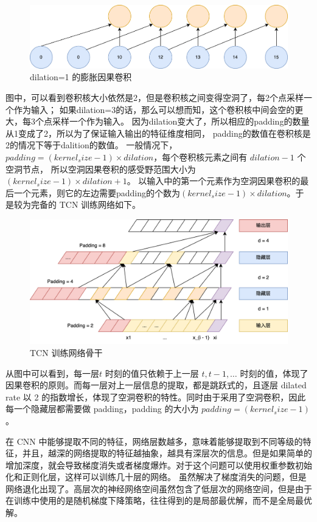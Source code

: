 \begin{figure}[htbp]
  \centering
  \includegraphics[width=\textwidth]{figures/dilation_convolution.png}
  \caption{dilation=1 的膨胀因果卷积}
\end{figure}

图中，可以看到卷积核大小依然是2，但是卷积核之间变得空洞了，每2个点采样一个作为输入；
如果dilation=3的话，那么可以想而知，这个卷积核中间会空的更大，每3个点采样一个作为输入。
因为dilation变大了，所以相应的padding的数量从1变成了2，所以为了保证输入输出的特征维度相同，
padding的数值在卷积核是2的情况下等于dalition的数值。
一般情况下，$padding=(kernel_size-1)\times dilation$，每个卷积核元素之间有 $dilation - 1$ 个空洞节点，
所以空洞因果卷积的感受野范围大小为 $(kernel_size-1) \times dilation + 1$。
以输入中的第一个元素作为空洞因果卷积的最后一个元素，则它的左边需要padding的个数为$(kernel_size-1) \times dilation$。于是较为完备的 TCN 训练网络如下。

\begin{figure}[htbp]
  \centering
  \includegraphics[width=\textwidth]{figures/tcn_1.png}
  \caption{TCN 训练网络骨干}
\end{figure}

从图中可以看到，每一层$t$ 时刻的值只依赖于上一层 $t, t - 1, \dots$ 时刻的值，体现了因果卷积的原则。而每一层对上一层信息的提取，都是跳跃式的，且逐层 dilated rate 以 2 的指数增长，体现了空洞卷积的特性。同时由于采用了空洞卷积，因此每一个隐藏层都需要做 padding，padding 的大小为 $padding = (kernel_size - 1)$。

在 CNN 中能够提取不同的特征，网络层数越多，意味着能够提取到不同等级的特征，并且，越深的网络提取的特征越抽象，越具有深层次的信息。但是如果简单的增加深度，就会导致梯度消失或者梯度爆炸。对于这个问题可以使用权重参数初始化和正则化层，这样可以训练几十层的网络\cite{吕国豪2014基于卷积神经网络的正则化方法}。
虽然解决了梯度消失的问题，但是网络退化出现了。高层次的神经网络空间虽然包含了低层次的网络空间，但是由于在训练中使用的是随机梯度下降策略，往往得到的是局部最优解，而不是全局最优解。

